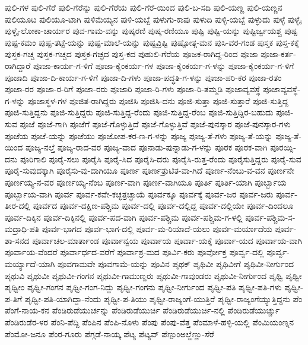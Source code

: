 ಪುಲಿ-ಗಳ
ಪುಲಿ-ಗೆರೆ
ಪುಲಿ-ಗೆರೆನ್ನು
ಪುಲಿ-ಗೆರೆಯ
ಪುಲಿ-ಗೆರೆ-ಯಿಂದ
ಪುಲಿ-ಬ-ಸದಿ
ಪುಲಿ-ಯಣ್ಣ
ಪುಲಿ-ಯಣ್ಣನ
ಪುಲಿಯೂಟ
ಪುಲಿಯೂ-ಟಾಗಿ
ಪುಳಿಮೆಯ್ಯನ
ಪುಳಿ-ಯಬ್ಬೆ
ಪುಳುಗು-ಕಾಪು
ಪುಳುದಿ
ಪುಳ್ಳಿ-ಯಬ್ಬೆ
ಪುಳ್ಳುದು
ಪುಳ್ಳೆ
ಪುಳ್ಳೈ
ಪುಳ್ಳೈ-ಲೋಕಾ-ಚಾರ್ಯರ
ಪುವ-ಗಾಮ-ವನ್ನು
ಪುಷ್ಕರಣಿ
ಪುಷ್ಕ-ರಣಿಯೂ
ಪುಷ್ಟಿ
ಪುಷ್ಟಿ-ಯನ್ನು
ಪುಷ್ಟಿರ್ಜ್ವಯಶ್ಚ
ಪುಷ್ಪ
ಪುಷ್ಪ-ಕಮಂ
ಪುಷ್ಪ-ತಟ್ಟೆ-ಯನ್ನು
ಪುಷ್ಪ-ಮಾಲೆ-ಯನ್ನು
ಪುಷ್ಪವ್ರಿಷ್ಟಿ
ಪುಷ್ಪೋತ್ಗ-ಮನ
ಪುಸಿ-ವರ-ಗಂಡ
ಪುಸ್ತಕ
ಪುಸ್ತ-ಕಕ್ಕೆ
ಪುಸ್ತಕ-ಗಚ್ಚ
ಪುಸ್ತಕ-ಗಚ್ಚದ
ಪುಸ್ತಕ-ಗಚ್ಛದ
ಪುಸ್ತ-ಕದ
ಪುಹುಲಿ-ಗೆರೆಯ
ಪೂಜಕ-ರಾಗಿದ್ದ-ರಿಂದ
ಪೂಜಾ
ಪೂಜಾ-ಕರ್ತ-ರಾಗಿದ್ದಾರೆ
ಪೂಜಾ-ಕಾರ್ಯ-ಗ-ಳಿಗೆ
ಪೂಜಾ-ಕೈಂಕರ್ಯ-ಗಳ
ಪೂಜಾ-ಕೈಂಕರ್ಯ-ಗ-ಳನ್ನು
ಪೂಜಾ-ಕೈಂಕರ್ಯ-ಗ-ಳಿಗೆ
ಪೂಜಾದಿ
ಪೂಜಾ-ದಿ-ಕಾರ್ಯ-ಗ-ಳಿಗೆ
ಪೂಜಾ-ದಿ-ಗಳು
ಪೂಜಾ-ಪದ್ಧತಿ-ಗ-ಳನ್ನು
ಪೂಜಾ-ಪರಿ-ಕರ
ಪೂಜಾ-ರತಂ
ಪೂಜಾ-ರರ
ಪೂಜಾ-ರ-ರಿಗೆ
ಪೂಜಾ-ರರು
ಪೂಜಾರಿ
ಪೂಜಾ-ರಿ-ಗಳು
ಪೂಜಾ-ರಿ-ತಮ್ಮಡಿ
ಪೂಜಾವ್ಯವಸ್ಥೆ
ಪೂಜಾವ್ಯವಸ್ಥೆ-ಗ-ಳನ್ನು
ಪೂಜಾಸ್ಥಳ-ಗಳ
ಪೂಜಿತ-ರಾಗಿದ್ದರು
ಪೂಜಿಸಿ
ಪೂಜಿಸಿ-ದನು
ಪೂಜಿ-ಸುತ್ತಾ
ಪೂಜಿ-ಸುತ್ತಾರೆ
ಪೂಜಿ-ಸುತ್ತಿದ್ದ
ಪೂಜಿ-ಸುತ್ತಿದ್ದನು
ಪೂಜಿ-ಸುತ್ತಿದ್ದರು
ಪೂಜಿ-ಸುತ್ತಿದ್ದ-ರೆಂದು
ಪೂಜಿ-ಸುತ್ತಿದ್ದ-ರೆಂಬ
ಪೂಜಿ-ಸುತ್ತಿದ್ದಿರ-ಬಹುದು
ಪೂಜಿ-ಸುವ
ಪೂಜೆ
ಪೂಜೆ-ಗಾಗಿ
ಪೂಜೆಗೆ
ಪೂಜೆ-ಗೊಳ್ಳುತ್ತಿದೆ
ಪೂಜೆ-ಗೊಳ್ಳುತ್ತಿವೆ
ಪೂಜೆ-ಪುನಸ್ಕಾರ
ಪೂಜೆ-ಪುನಸ್ಕಾರ-ಗಳು
ಪೂಜೆಯ
ಪೂಜೆ-ಯನ್ನು
ಪೂಜೆಯು
ಪೂಜೋಪ-ಕರ-ಣ-ಗ-ಳನ್ನು
ಪೂಜ್ಯ
ಪೂಜ್ಯ-ತೆ-ಗಳು
ಪೂಜ್ಯ-ತೆ-ಯನ್ನು
ಪೂಜ್ಯ-ತೆ-ಯಿಂದ
ಪೂಜ್ಯ-ನಲ್ತೆ
ಪೂಜ್ಯ-ರಾದ-ವರ
ಪೂಜ್ಯ-ವಾದ
ಪೂನಾಡು-ಪುನ್ನಾಡು-ಗ-ಳನ್ನು
ಪೂರಕ
ಪೂರಕ-ವಾಗಿ
ಪೂರಯ್ಸಿ-ದನು
ಪೂರಿಗಾಲಿ
ಪೂರೈ-ಸಲು
ಪೂರೈಸಿ
ಪೂರೈ-ಸಿದ
ಪೂರೈಸಿ-ದರು
ಪೂರೈಸಿ-ರುತ್ತ-ರೆಂದು
ಪೂರೈಸುತ್ತಿದ್ದರು
ಪೂರೈ-ಸುವ
ಪೂರೈ-ಸುವುದಕ್ಕಾಗಿ
ಪೂರೈಸು-ವು-ದಾಗಿಯೂ
ಪೂರ್ಣ
ಪೂರ್ಣತ್ರುಟಿತ-ವಾ-ಗಿದೆ
ಪೂರ್ಣ-ನೆಂಬು-ವ-ವನ
ಪೂರ್ಣನೇ
ಪೂರ್ಣಯ್ಯ-ನ-ವರ
ಪೂರ್ಣಯ್ಯ-ನೆಂಬ
ಪೂರ್ಣ-ವಾಗಿ
ಪೂರ್ಣ-ವಾಗಿಯೂ
ಪೂರ್ತಿ
ಪೂರ್ತಿ-ಯಾಗಿ
ಪೂರ್ಬ್ಬಾಯ
ಪೂರ್ಬ್ಬಾಯ-ವಾಗಿ
ಪೂರ್ವ
ಪೂರ್ವ-ಕವೇ-ಕಚ್ಛತ್ರಚ್ಛಾಯೆ
ಪೂರ್ವಕ್ಕೂ
ಪೂರ್ವಕ್ಕೆ
ಪೂರ್ವ-ಜರ
ಪೂರ್ವ-ಜರು
ಪೂರ್ವ-ತೀರ-ದಲ್ಲಿ
ಪೂರ್ವದ
ಪೂರ್ವ-ದಕ್ಷಿಣ-ಪಶ್ಚಿಮ
ಪೂರ್ವ-ದಲ್ಲಿ
ಪೂರ್ವ-ದಲ್ಲಿದ್ದ
ಪೂರ್ವ-ದಲ್ಲಿಯೇ
ಪೂರ್ವ-ದಿಂದಲೂ
ಪೂರ್ವ-ದಿಕ್ಕಿನ
ಪೂರ್ವ-ದಿಕ್ಕಿನಲ್ಲಿ
ಪೂರ್ವ-ಪದ-ವಾಗಿ
ಪೂರ್ವ-ಪಶ್ಚಿಮ
ಪೂರ್ವ-ಪಶ್ಚಿಮ-ಗ-ಳಲ್ಲಿ
ಪೂರ್ವ-ಪಶ್ಚಿಮ-ಸ-ಮದ್ರಾಧಿ-ಪತಿ
ಪೂರ್ವ-ಭಾಗದ
ಪೂರ್ವ-ಭಾಗ-ದಲ್ಲಿ
ಪೂರ್ವ-ಮ-ರಿಯಾದೆ-ಯಲು
ಪೂರ್ವ-ಮರ್ಯಾದೆಯ
ಪೂರ್ವ-ಶಾ-ಸನದ
ಪೂರ್ವಾಚಲ-ಮಾರ್ತಾಂಡ
ಪೂರ್ವಾನ್ವಯ
ಪೂರ್ವಾಯ
ಪೂರ್ವಾ-ಯಕ್ಕೆ
ಪೂರ್ವಾ-ಯದ
ಪೂರ್ವಾಯ-ವಾಗಿ
ಪೂರ್ವಾಯ-ವೆಂದರೆ
ಪೂರ್ವಾರ್ಧದ-ವರೆಗೆ
ಪೂರ್ವಾಶ್ರ-ಮದ
ಪೂರ್ವಿ-ಕರು
ಪೂರ್ವೋಕ್ತ
ಪೂರ್ವ್ವ-ದಲ್ಲಿ
ಪೂರ್ವ್ವ-ಮರ್ಯ್ಯಾದೆ-ಯಾಗಿ
ಪೂವಗಾಮವೇ
ಪೂವಗಾಮೆ-ಯನ್ನು
ಪೂವಿನ
ಪೃಥಕ್
ಪೃಥಿವೀ
ಪೃಥಿವೀಗೆ
ಪೃಥಿವೀ-ನೀರ್ಗುಂದ
ಪೃಥುವಿ
ಪೃಥುವೀ
ಪೃಥುವೀ-ಗಂಗನ
ಪೃಥುವೀ-ಗಾಮುಣ್ಡರು
ಪೃಥುವೀ-ಗಾವುಂಡರು
ಪೃಥುವೀ-ನೀರ್ಗುಂದ
ಪೃಥ್ವಿ
ಪೃಥ್ವೀ
ಪೃಥ್ವೀಂ
ಪೃಥ್ವೀ-ಗಂಗನ
ಪೃಥ್ವೀ-ಗಂಗ-ನಿದ್ದು
ಪೃಥ್ವೀ-ಗಂಗನು
ಪೃಥ್ವೀ-ನೀರ್ಗುಂದ
ಪೃಥ್ವೀ-ಪತಿ
ಪೃಥ್ವೀ-ಪತಿ-ಗಳು
ಪೃಥ್ವೀ-ಪ-ತಿಗೆ
ಪೃಥ್ವೀ-ಪತಿ-ಯಾಗಿದ್ದಾ-ನೆಂದು
ಪೃಥ್ವೀ-ಪ-ತಿಯು
ಪೃಥ್ವೀ-ರಾಜ್ಯಂಗೆ-ಯುತ್ತಿರೆ
ಪೃಥ್ವೀ-ರಾಜ್ಯಂಗೆಯ್ಯುತ್ತಿದ್ದನು
ಪೆಂ
ಪೆಂಗೆ-ನಾಯ-ಕನ
ಪೆಂಡಿರುಡೆಯುರ್ಚನ್ನು
ಪೆಂಡಿರುಡೆಯುರ್ಚಿ
ಪೆಂಡಿರುಡೆಯುರ್ಚಿ-ನಲ್ಲಿ
ಪೆಂಡಿರುಡೆಯುರ್ಚ್ಚು
ಪೆಂಡಿರುಡೆರ-ಳರ
ಪೆಂನಿ-ಪೆದ್ದಿ
ಪೆಂಪಿನ
ಪೆಂಪಿ-ನೊಳು
ಪೆಂಪು
ಪೆಂಪು-ವೆತ್ತ
ಪೆಂಮಾಳೆ-ಹಳ್ಳಿ-ಯಲ್ಲಿ
ಪೆಂಮಿಯಂಣ್ನನ
ಪೆಂಮೋ-ಜನೂ
ಪೆಂರ-ಗೂರು
ಪೆಗ್ಗಡೆ-ನಾಯ್ಕ
ಪೆಟ್ಯ
ಪೆಟ್ಯವ್
ಪೆಣ್ಪುಂಅಲ್ಹೆಣ್ಣು-ಸೆರೆ
